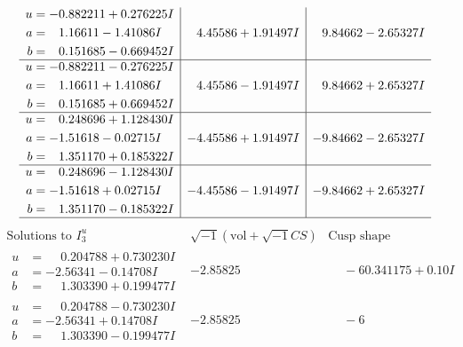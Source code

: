 \documentclass[1p]{elsarticle_modified}
\theoremstyle{definition}
\newcommand{\I}{\sqrt{-1}}
\begin{document}
$$\begin{array}{c|c|c}
\begin{aligned}
u &= -0.882211 + 0.276225 I \\
a &= \phantom{-}1.16611 - 1.41086 I \\
b &= \phantom{-}0.151685 - 0.669452 I\end{aligned}
 & \phantom{-}4.45586 + 1.91497 I & \phantom{-}9.84662 - 2.65327 I \\ \hline\begin{aligned}
u &= -0.882211 - 0.276225 I \\
a &= \phantom{-}1.16611 + 1.41086 I \\
b &= \phantom{-}0.151685 + 0.669452 I\end{aligned}
 & \phantom{-}4.45586 - 1.91497 I & \phantom{-}9.84662 + 2.65327 I \\ \hline\begin{aligned}
u &= \phantom{-}0.248696 + 1.128430 I \\
a &= -1.51618 - 0.02715 I \\
b &= \phantom{-}1.351170 + 0.185322 I\end{aligned}
 & -4.45586 + 1.91497 I & -9.84662 - 2.65327 I \\ \hline\begin{aligned}
u &= \phantom{-}0.248696 - 1.128430 I \\
a &= -1.51618 + 0.02715 I \\
b &= \phantom{-}1.351170 - 0.185322 I\end{aligned}
 & -4.45586 - 1.91497 I & -9.84662 + 2.65327 I\\
 \hline 
 \end{array}$$\newpage$$\begin{array}{c|c|c}  
\text{Solutions to }I^u_{3}& \I (\text{vol} + \sqrt{-1}CS) & \text{Cusp shape}\\
 \hline 
\begin{aligned}
u &= \phantom{-}0.204788 + 0.730230 I \\
a &= -2.56341 - 0.14708 I \\
b &= \phantom{-}1.303390 + 0.199477 I\end{aligned}
 & -2.85825\phantom{ +0.000000I} & \phantom{-}                -6
0.341175 + 0. 10   I\phantom{ +0.000000I} \\ \hline\begin{aligned}
u &= \phantom{-}0.204788 - 0.730230 I \\
a &= -2.56341 + 0.14708 I \\
b &= \phantom{-}1.303390 - 0.199477 I\end{aligned}
 & -2.85825\phantom{ +0.000000I} & \phantom{-}                -6

\end{array}$$
\end{document}
